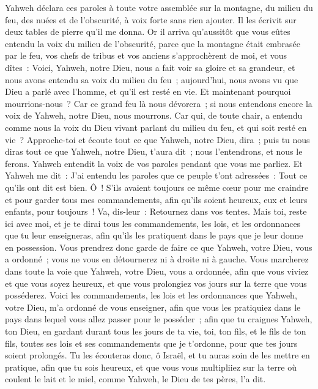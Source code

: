 \begin{multicols}{2}
Yahweh déclara ces paroles à toute votre assemblée sur la montagne, du milieu du feu, des nuées et de l'obscurité, à voix forte sans rien ajouter. Il les écrivit sur deux tables de pierre qu'il me donna.
Or il arriva qu'aussitôt que vous eûtes entendu la voix du milieu de l'obscurité, parce que la montagne était embrasée par le feu, vos chefs de tribus et vos anciens s'approchèrent de moi,
et vous dîtes~: Voici, Yahweh, notre Dieu, nous a fait voir sa gloire et sa grandeur, et nous avons entendu sa voix du milieu du feu~; aujourd'hui, nous avons vu que Dieu a parlé avec l'homme, et qu'il est resté en vie.
Et maintenant pourquoi mourrions-nous~? Car ce grand feu là nous dévorera~; si nous entendons encore la voix de Yahweh, notre Dieu, nous mourrons.
Car qui, de toute chair, a entendu comme nous la voix du Dieu vivant parlant du milieu du feu, et qui soit resté en vie~?
Approche-toi et écoute tout ce que Yahweh, notre Dieu, dira~; puis tu nous diras tout ce que Yahweh, notre Dieu, t'aura dit~; nous l'entendrons, et nous le ferons.
Yahweh entendit la voix de vos paroles pendant que vous me parliez. Et Yahweh me dit~: J'ai entendu les paroles que ce peuple t'ont adressées~: Tout ce qu'ils ont dit est bien.
Ô~! S'ils avaient toujours ce même cœur pour me craindre et pour garder tous mes commandements, afin qu'ils soient heureux, eux et leurs enfants, pour toujours~!
Va, dis-leur~: Retournez dans vos tentes.
Mais toi, reste ici avec moi, et je te dirai tous les commandements, les lois, et les ordonnances que tu leur enseigneras, afin qu'ils les pratiquent dans le pays que je leur donne en possession.
Vous prendrez donc garde de faire ce que Yahweh, votre Dieu, vous a ordonné~; vous ne vous en détournerez ni à droite ni à gauche.
Vous marcherez dans toute la voie que Yahweh, votre Dieu, vous a ordonnée, afin que vous viviez et que vous soyez heureux, et que vous prolongiez vos jours sur la terre que vous posséderez.
\VerseOne{}Voici les commandements, les lois et les ordonnances que Yahweh, votre Dieu, m'a ordonné de vous enseigner, afin que vous les pratiquiez dans le pays dans lequel vous allez passer pour le posséder~;
afin que tu craignes Yahweh, ton Dieu, en gardant durant tous les jours de ta vie, toi, ton fils, et le fils de ton fils, toutes ses lois et ses commandements que je t'ordonne, pour que tes jours soient prolongés.
Tu les écouteras donc, ô Israël, et tu auras soin de les mettre en pratique, afin que tu sois heureux, et que vous vous multipliiez sur la terre où coulent le lait et le miel, comme Yahweh, le Dieu de tes pères, l'a dit.

\end{multicols}
